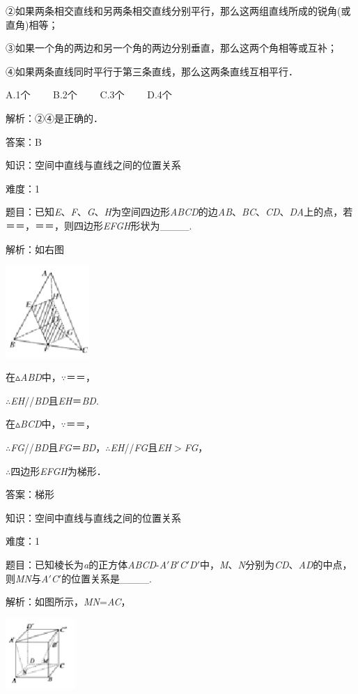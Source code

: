 \documentclass{article} %
\begin{document}
②如果两条相交直线和另两条相交直线分别平行，那么这两组直线所成的锐角(或直角)相等；

③如果一个角的两边和另一个角的两边分别垂直，那么这两个角相等或互补；

④如果两条直线同时平行于第三条直线，那么这两条直线互相平行．

A.1个　　 B.2个　　 C.3个　　 D.4个

解析：②④是正确的．

答案：B

知识：空间中直线与直线之间的位置关系

难度：1

题目：已知\textit{E}、\textit{F}、\textit{G}、\textit{H}为空间四边形\textit{ABCD}的边\textit{AB}、\textit{BC}、\textit{CD}、\textit{DA}上的点，若＝＝，＝＝，则四边形\textit{EFGH}形状为\_\_\_\_.

解析：如右图

\includegraphics*[width=1.25in, height=1.37in, keepaspectratio=false]{image104}

在$\mathrm{\vartriangle}$\textit{ABD}中，$\mathrm{\because}$＝＝，

$\mathrm{\therefore}$\textit{EH}//\textit{BD}且\textit{EH}＝\textit{BD}.

在$\mathrm{\vartriangle}$\textit{BCD}中，$\mathrm{\because}$＝＝，

$\mathrm{\therefore}$\textit{FG}//\textit{BD}且\textit{FG}＝\textit{BD}，$\mathrm{\therefore}$\textit{EH}//\textit{FG}且\textit{EH}$\mathrm{>}$\textit{FG}，

$\mathrm{\therefore}$四边形\textit{EFGH}为梯形．

答案：梯形

知识：空间中直线与直线之间的位置关系

难度：1

题目：已知棱长为\textit{a}的正方体\textit{ABCD}-\textit{A}$'$\textit{B}$'$\textit{C}$'$\textit{D}$'$中，\textit{M}、\textit{N}分别为\textit{CD}、\textit{AD}的中点，则\textit{MN}与\textit{A}$'$\textit{C}$'$的位置关系是\_\_\_\_.

解析：如图所示，\textit{MN}=\textit{AC}，

\includegraphics*[width=1.04in, height=1.04in, keepaspectratio=false]{image105}
\end{document}
